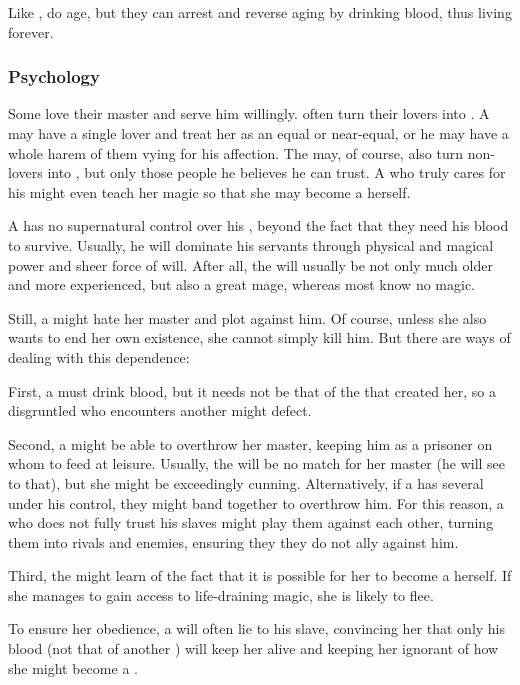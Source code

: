 Like \Reavers{}, \Leeches{} do age, but they can arrest and reverse aging by drinking blood, thus living forever. 

\subsubsection{Psychology}
Some \Leeches{} love their \Reaver{} master and serve him willingly. \Reavers{} often turn their lovers into \Leeches{}. A \Reaver{} may have a single \Leech{} lover and treat her as an equal or near-equal, or he may have a whole harem of them vying for his affection. The \Reaver{} may, of course, also turn non-lovers into \Leeches, but only those people he believes he can trust. A \Reaver{} who truly cares for his \Leech{} might even teach her magic so that she may become a \Reaver{} herself. 

A \Reaver{} has no supernatural control over his \Leeches{}, beyond the fact that they need his blood to survive. Usually, he will dominate his \Leech{} servants through physical and magical power and sheer force of will. After all, the \Reaver{} will usually be not only much older and more experienced, but also a great mage, whereas most \Leeches{} know no magic. 

Still, a \Leech{} might hate her \Reaver{} master and plot against him. Of course, unless she also wants to end her own existence, she cannot simply kill him. But there are ways of dealing with this dependence:

First, a \Leech{} must drink \Reaver{} blood, but it needs not be that of the \Reaver{} that created her, so a disgruntled \Leech{} who encounters another \Reaver{} might defect. 

Second, a \Leech{} might be able to overthrow her master, keeping him as a prisoner on whom to feed at leisure. Usually, the \Leech{} will be no match for her \Reaver{} master (he will see to that), but she might be exceedingly cunning. Alternatively, if a \Reaver{} has several \Leeches{} under his control, they might band together to overthrow him. For this reason, a \Reaver{} who does not fully trust his \Leech{} slaves might play them against each other, turning them into rivals and enemies, ensuring they they do not ally against him. 

Third, the \Leech{} might learn of the fact that it is possible for her to become a \Reaver{} herself. If she manages to gain access to life-draining magic, she is likely to flee. 

To ensure her obedience, a \Reavers{} will often lie to his \Leech{} slave, convincing her that only his blood (not that of another \Reaver) will keep her alive and keeping her ignorant of how she might become a \Reaver. 

